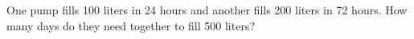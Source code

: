 One pump fills 100 liters in 24 hours and another fills 200 liters in 72 hours. How many days do they need together to fill 500 liters?

